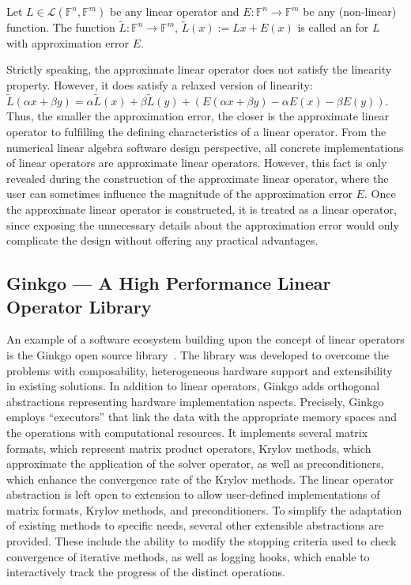 \begin{definition}
\label{conclusion:def:apprximate-linop}
Let $L \in \mathcal{L}(\mathbb{F}^n,\mathbb{F}^m)$ be any linear operator and $E
: \mathbb{F}^n \rightarrow \mathbb{F}^m$ be any (non-linear) function.
The function $\widetilde{L} : \mathbb{F}^n \rightarrow \mathbb{F}^m$,
$\widetilde{L}(x) := Lx + E(x)$ is called an  for $L$ with approximation error $E$.
\end{definition}

Strictly speaking, the approximate linear operator does not satisfy the linearity
property. However, it does satisfy a relaxed version of linearity:
$\widetilde{L}(\alpha x + \beta y) = \alpha \widetilde{L}(x) + \beta
\widetilde{L}(y) + (E(\alpha x + \beta y) - \alpha E(x) - \beta E(y))$. Thus,
the smaller the approximation error, the closer is the approximate linear
operator to fulfilling the defining characteristics of a linear operator. From
the numerical linear algebra software design perspective, all concrete
implementations of linear operators are approximate linear operators. However,
this fact is only revealed during the construction of the approximate linear
operator, where the user can sometimes influence the magnitude of the
approximation error $E$. Once the approximate linear operator is constructed, it
is treated as a linear operator, since exposing the unnecessary details about
the approximation error would only complicate the design without offering any
practical advantages.


\subsection{Ginkgo --- A High Performance Linear Operator Library}

An example of a software ecosystem building upon the concept of linear operators
is the Ginkgo open source library~\cite{ginkgo}. The library was developed to
overcome the problems with composability, heterogeneous hardware support and
extensibility in existing solutions. In addition to linear operators, Ginkgo
adds orthogonal abstractions representing hardware implementation aspects.
Precisely, Ginkgo employs ``executors'' that link the data with the appropriate
memory spaces and the operations with computational resources. It implements
several matrix formats, which represent matrix product operators, Krylov
methods, which approximate the application of the solver operator, as well as
preconditioners, which enhance the convergence rate of the Krylov methods. The
linear operator abstraction is left open to extension to allow user-defined
implementations of matrix formats, Krylov methods, and preconditioners. To
simplify the adaptation of existing methods to specific needs, several other
extensible abstractions are provided. These include the ability to modify the
stopping criteria used to check convergence of iterative methods, as well as
logging hooks, which enable to interactively track the progress of the distinct
operations.


